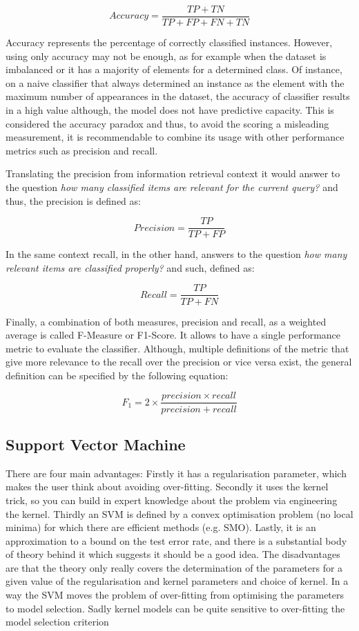 \[Accuracy=\frac{TP+TN}{TP+FP+FN+TN}\]

Accuracy represents the percentage of correctly classified instances. However, using only accuracy may not be enough, as for example when the dataset is imbalanced or it has a majority of elements for a determined class. Of instance, on a naive classifier that always determined an instance as the element with the maximum number of appearances in the dataset, the accuracy of classifier results in a high value although, the model does not have predictive capacity. This is considered the accuracy paradox \cite{accuracyParadox} and thus, to avoid the scoring a misleading measurement, it is recommendable to combine its usage with other performance metrics such as precision and recall.

Translating the precision from information retrieval context it would answer to the question \textit{how many classified items are relevant for the current query?} and thus, the precision is defined as:

\[Precision=\frac{TP}{TP+FP}\]

In the same context recall, in the other hand, answers to the question \textit{how many relevant items are classified properly?} and such, defined as:

\[Recall=\frac{TP}{TP+FN}\]

Finally, a combination of both measures, precision and recall, as a weighted average is called F-Measure or F1-Score. It allows to have a single performance metric to evaluate the classifier. Although, multiple definitions of the metric that give more relevance to the recall over the precision or vice versa exist, the general definition can be specified by the following equation:

\[F_1=2 \times \frac{precision \times recall}{precision+recall}\]

\iffalse

\subsection{Support Vector Machine}

There are four main advantages: Firstly it has a regularisation parameter, which makes the user think about avoiding over-fitting. Secondly it uses the kernel trick, so you can build in expert knowledge about the problem via engineering the kernel. Thirdly an SVM is defined by a convex optimisation problem (no local minima) for which there are efficient methods (e.g. SMO). Lastly, it is an approximation to a bound on the test error rate, and there is a substantial body of theory behind it which suggests it should be a good idea.
The disadvantages are that the theory only really covers the determination of the parameters for a given value of the regularisation and kernel parameters and choice of kernel. In a way the SVM moves the problem of over-fitting from optimising the parameters to model selection. Sadly kernel models can be quite sensitive to over-fitting the model selection criterion \cite{cawley2010over}

